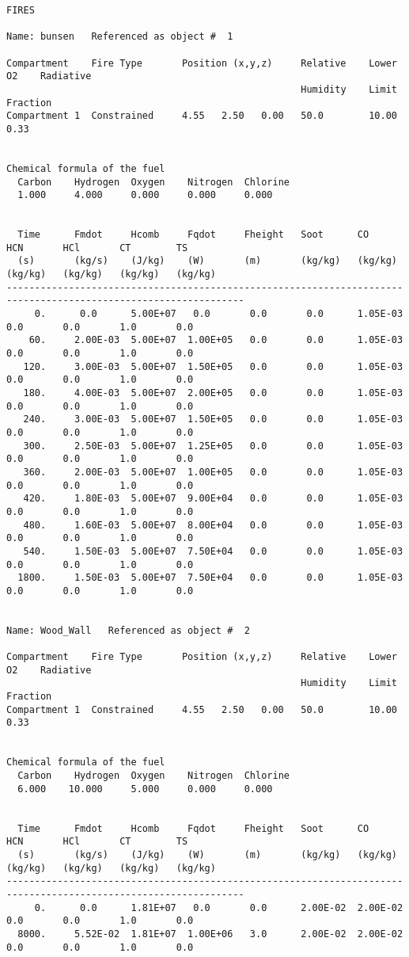 \begin{lstlisting}[basicstyle=\tiny]
FIRES

Name: bunsen   Referenced as object #  1

Compartment    Fire Type       Position (x,y,z)     Relative    Lower O2    Radiative
                                                    Humidity    Limit       Fraction
Compartment 1  Constrained     4.55   2.50   0.00   50.0        10.00        0.33


Chemical formula of the fuel
  Carbon    Hydrogen  Oxygen    Nitrogen  Chlorine
  1.000     4.000     0.000     0.000     0.000


  Time      Fmdot     Hcomb     Fqdot     Fheight   Soot      CO        HCN       HCl       CT        TS
  (s)       (kg/s)    (J/kg)    (W)       (m)       (kg/kg)   (kg/kg)   (kg/kg)   (kg/kg)   (kg/kg)   (kg/kg)
----------------------------------------------------------------------------------------------------------------
     0.      0.0      5.00E+07   0.0       0.0       0.0      1.05E-03   0.0       0.0       1.0       0.0
    60.     2.00E-03  5.00E+07  1.00E+05   0.0       0.0      1.05E-03   0.0       0.0       1.0       0.0
   120.     3.00E-03  5.00E+07  1.50E+05   0.0       0.0      1.05E-03   0.0       0.0       1.0       0.0
   180.     4.00E-03  5.00E+07  2.00E+05   0.0       0.0      1.05E-03   0.0       0.0       1.0       0.0
   240.     3.00E-03  5.00E+07  1.50E+05   0.0       0.0      1.05E-03   0.0       0.0       1.0       0.0
   300.     2.50E-03  5.00E+07  1.25E+05   0.0       0.0      1.05E-03   0.0       0.0       1.0       0.0
   360.     2.00E-03  5.00E+07  1.00E+05   0.0       0.0      1.05E-03   0.0       0.0       1.0       0.0
   420.     1.80E-03  5.00E+07  9.00E+04   0.0       0.0      1.05E-03   0.0       0.0       1.0       0.0
   480.     1.60E-03  5.00E+07  8.00E+04   0.0       0.0      1.05E-03   0.0       0.0       1.0       0.0
   540.     1.50E-03  5.00E+07  7.50E+04   0.0       0.0      1.05E-03   0.0       0.0       1.0       0.0
  1800.     1.50E-03  5.00E+07  7.50E+04   0.0       0.0      1.05E-03   0.0       0.0       1.0       0.0


Name: Wood_Wall   Referenced as object #  2

Compartment    Fire Type       Position (x,y,z)     Relative    Lower O2    Radiative
                                                    Humidity    Limit       Fraction
Compartment 1  Constrained     4.55   2.50   0.00   50.0        10.00        0.33


Chemical formula of the fuel
  Carbon    Hydrogen  Oxygen    Nitrogen  Chlorine
  6.000    10.000     5.000     0.000     0.000


  Time      Fmdot     Hcomb     Fqdot     Fheight   Soot      CO        HCN       HCl       CT        TS
  (s)       (kg/s)    (J/kg)    (W)       (m)       (kg/kg)   (kg/kg)   (kg/kg)   (kg/kg)   (kg/kg)   (kg/kg)
----------------------------------------------------------------------------------------------------------------
     0.      0.0      1.81E+07   0.0       0.0      2.00E-02  2.00E-02   0.0       0.0       1.0       0.0
  8000.     5.52E-02  1.81E+07  1.00E+06   3.0      2.00E-02  2.00E-02   0.0       0.0       1.0       0.0
\end{lstlisting}
